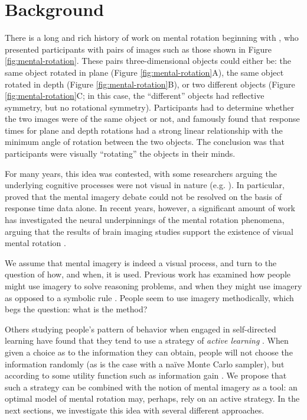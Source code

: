 \documentclass{article} %
\newcommand{\naive}[0]{na\"ive}
\begin{document}
\section{Background}

There is a long and rich history of work on mental rotation beginning
with \cite{Shepard1971}, who presented participants with pairs of
images such as those shown in Figure \ref{fig:mental-rotation}. These
pairs three-dimensional objects could either be: the same object
rotated in plane (Figure \ref{fig:mental-rotation}A), the same object
rotated in depth (Figure \ref{fig:mental-rotation}B), or two different
objects (Figure \ref{fig:mental-rotation}C; in this case, the
``different'' objects had reflective symmetry, but no rotational
symmetry). Participants had to determine whether the two images were
of the same object or not, and \cite{Shepard1971} famously found that
response times for plane and depth rotations had a strong linear
relationship with the minimum angle of rotation between the two
objects. The conclusion was that participants were visually
``rotating'' the objects in their minds.

For many years, this idea was contested, with some researchers arguing
the underlying cognitive processes were not visual in nature
(e.g. \cite{Pylyshyn1981}). In particular, \cite{Anderson1978} proved
that the mental imagery debate could not be resolved on the basis of
response time data alone. In recent years, however, a significant
amount of work has investigated the neural underpinnings of the mental
rotation phenomena, arguing that the results of brain imaging studies
support the existence of visual mental rotation \cite{Kosslyn1988,
  Kosslyn:2009tj}.

We assume that mental imagery is indeed a visual process, and turn to
the question of how, and when, it is used. Previous work has examined
how people might use imagery \cite{Hegarty2004, Schwartz1999} to solve
reasoning problems, and when they might use imagery as opposed to a
symbolic rule \cite{Schwartz:1996uy}. People seem to use imagery
methodically, which begs the question: what is the method? 

Others studying people's pattern of behavior when engaged in
self-directed learning have found that they tend to use a strategy of
\textit{active learning} \cite{Gureckis:2012gu, Markant:2012uu}. When
given a choice as to the information they can obtain, people will not
choose the information randomly (as is the case with a \naive{} Monte
Carlo sampler), but according to some utility function such as
information gain \cite{Nelson2007, Markant:2012uu}. We propose that
such a strategy can be combined with the notion of mental imagery as a
tool: an optimal model of mental rotation may, perhaps, rely on an
active strategy. In the next sections, we investigate this idea with
several different approaches.
\end{document}

